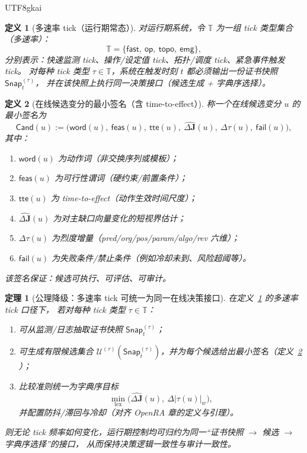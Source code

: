 \documentclass[12pt]{article}
\newtheorem{definition}{定义}[section]
\newtheorem{theorem}{定理}[section]
\begin{document}
\begin{CJK*}{UTF8}{gkai}
\begin{definition}[多速率 tick（运行期常态）]
\label{def:online-multi-rate-tick}
对运行期系统，令 $\mathbb{T}$ 为一组 tick 类型集合（多速率）：
\[
  \mathbb{T}=\{\mathsf{fast},\ \mathsf{op},\ \mathsf{topo},\ \mathsf{emg}\},
\]
分别表示：快速监测 tick、操作/设定值 tick、拓扑/调度 tick、紧急事件触发 tick。
对每种 tick 类型 $\tau\in\mathbb{T}$，系统在触发时刻 $t$ 都必须输出一份证书快照 $\mathsf{Snap}_{t}^{(\tau)}$，
并在该快照上执行同一决策接口（候选生成 + 字典序选择）。
\end{definition}

\begin{definition}[在线候选变分的最小签名（含 time-to-effect）]
\label{def:online-candidate-signature}
称一个在线候选变分 $u$ 的最小签名为
\[
  \mathsf{Cand}(u)
  :=
  \bigl(
    \mathsf{word}(u),\ \mathsf{feas}(u),\ \mathsf{tte}(u),\ \widehat{\Delta\mathbf{J}}(u),\ \Delta\tau(u),\ \mathsf{fail}
      (u)
  \bigr),
\]
其中：
\begin{enumerate}
  \item $\mathsf{word}(u)$ 为动作词（非交换序列或模板）；
  \item $\mathsf{feas}(u)$ 为可行性谓词（硬约束/前置条件）；
  \item $\mathsf{tte}(u)$ 为 time-to-effect（动作生效时间尺度）；
  \item $\widehat{\Delta\mathbf{J}}(u)$ 为对主缺口向量变化的短视界估计；
  \item $\Delta\tau(u)$ 为烈度增量（pred/org/pos/param/algo/rev 六维）；
  \item $\mathsf{fail}(u)$ 为失败条件/禁止条件（例如冷却未到、风险超阈等）。
\end{enumerate}
该签名保证：候选可执行、可评估、可审计。
\end{definition}

\begin{theorem}[公理降级：多速率 tick 可统一为同一在线决策接口]
\label{thm:online-multi-rate-unified-interface}
在定义~\ref{def:online-multi-rate-tick} 的多速率 tick 口径下，
若对每种 tick 类型 $\tau\in\mathbb{T}$：
\begin{enumerate}
  \item 可从监测/日志抽取证书快照 $\mathsf{Snap}_{t}^{(\tau)}$；
  \item 可生成有限候选集合 $\mathcal{U}^{(\tau)}(\mathsf{Snap}_{t}^{(\tau)})$，并为每个候选给出最小签名（定义~\ref{def:online-candidate-signature}
    ）；
  \item 比较准则统一为字典序目标
  \[
    \min_{\mathrm{lex}}\bigl(\widehat{\Delta\mathbf{J}}(u),\ \Delta|\tau(u)|_w\bigr),
  \]
  并配置防抖/滞回与冷却（对齐 OpenRA 章的定义与引理）。
\end{enumerate}
则无论 tick 频率如何变化，运行期控制均可归约为同一“证书快照 $\to$ 候选 $\to$ 字典序选择”的接口，
从而保持决策逻辑一致性与审计一致性。
\end{theorem}


\end{CJK*}
\end{document}

